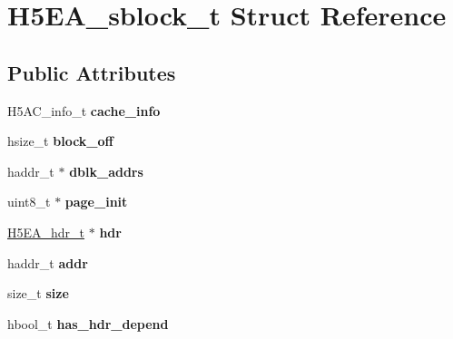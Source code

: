 \hypertarget{struct_h5_e_a__sblock__t}{}\section{H5\+E\+A\+\_\+sblock\+\_\+t Struct Reference}
\label{struct_h5_e_a__sblock__t}
\subsection*{Public Attributes}
\begin{DoxyCompactItemize}
\item 
\mbox{\label{struct_h5_e_a__sblock__t_aed91b6456e70a0a63d42ba755ec3d921}} 
H5\+A\+C\+\_\+info\+\_\+t {\bfseries cache\+\_\+info}
\item 
\mbox{\label{struct_h5_e_a__sblock__t_a9d6efb1ca012dc5fd1b9b15f619f14a3}} 
hsize\+\_\+t {\bfseries block\+\_\+off}
\item 
\mbox{\label{struct_h5_e_a__sblock__t_ae87d0fff33b2ec4a10fe7629718fb8b5}} 
haddr\+\_\+t $\ast$ {\bfseries dblk\+\_\+addrs}
\item 
\mbox{\label{struct_h5_e_a__sblock__t_afc2c3dc023cbdf79700feec176de2d86}} 
uint8\+\_\+t $\ast$ {\bfseries page\+\_\+init}
\item 
\mbox{\label{struct_h5_e_a__sblock__t_a40ae1e7f65874de10ff36916e6d1445f}} 
\hyperlink{struct_h5_e_a__hdr__t}{H5\+E\+A\+\_\+hdr\+\_\+t} $\ast$ {\bfseries hdr}
\item 
\mbox{\label{struct_h5_e_a__sblock__t_ac83ea2916bdd3835c21462765e63e226}} 
haddr\+\_\+t {\bfseries addr}
\item 
\mbox{\label{struct_h5_e_a__sblock__t_a86765a3b3357d75b1b839f6df1b0eae6}} 
size\+\_\+t {\bfseries size}
\item 
\mbox{\label{struct_h5_e_a__sblock__t_aee457584df79e103b4a70abd37477175}} 
hbool\+\_\+t {\bfseries has\+\_\+hdr\+\_\+depend}
\item 
\mbox{\label{struct_h5_e_a__sblock__t_ad43023eefa5e181f25441438c7a511e3}} 

\end{DoxyCompactItemize}
